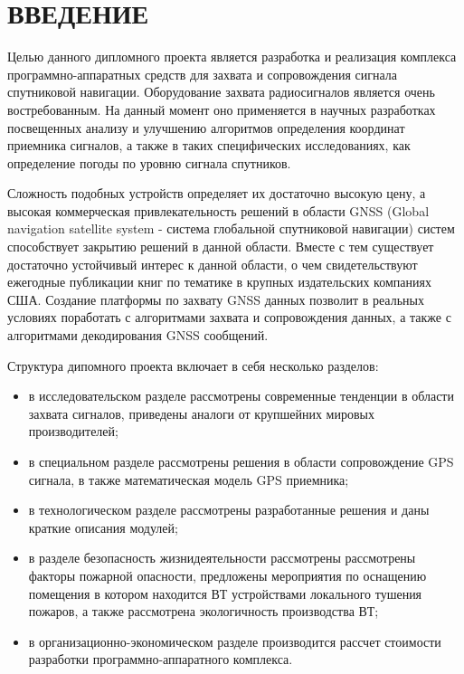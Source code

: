 \section*{ВВЕДЕНИЕ}
Целью данного дипломного проекта является разработка и реализация комплекса программно-аппаратных средств
для захвата и сопровождения сигнала спутниковой навигации. Оборудование захвата радиосигналов является очень востребованным.
На данный момент оно применяется в научных разработках посвещенных анализу и улучшению алгоритмов определения координат 
приемника сигналов, а также в таких специфических исследованиях, как определение погоды по уровню сигнала спутников.

Сложность подобных устройств определяет их достаточно высокую цену, а высокая коммерческая привлекательность решений в области
GNSS (Global navigation satellite system - система глобальной спутниковой навигации) систем способствует закрытию решений в
данной области. Вместе с тем существует достаточно устойчивый интерес к данной области,
о чем свидетельствуют ежегодные публикации книг по тематике в крупных издательских компаниях США. Создание платформы по захвату
GNSS данных позволит в реальных условиях поработать с алгоритмами захвата и сопровождения данных, а также с алгоритмами
декодирования GNSS сообщений.

Структура дипомного проекта включает в себя несколько разделов:
\begin{itemize}
	\item в исследовательском разделе рассмотрены современные тенденции в области захвата сигналов, приведены
	      аналоги от крупшейних мировых производителей;
	\item в специальном разделе рассмотрены решения в области сопровождение GPS сигнала, в также математическая модель GPS приемника; 
	\item в технологическом разделе рассмотрены разработанные решения и даны краткие описания модулей;
	\item в разделе безопасность жизнидеятельности рассмотрены рассмотрены факторы пожарной опасности, предложены мероприятия по
	      оснащению помещения в котором находится ВТ устройствами локального тушения пожаров, а также рассмотрена экологичность
	      производства ВТ;
	\item в организационно-экономическом разделе производится рассчет стоимости разработки программно-аппаратного комплекса.
\end{itemize}

\newpage
